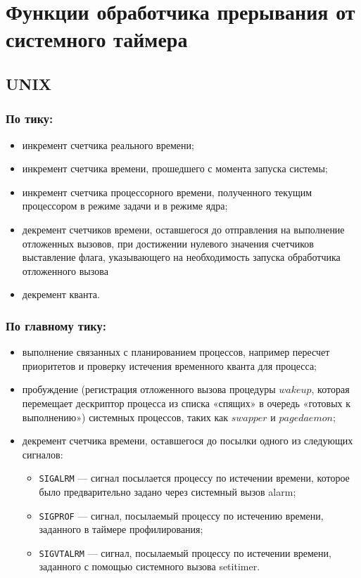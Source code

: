 \chapter{Функции обработчика прерывания от системного таймера}

\section{UNIX}

\subsection*{По тику:}

\begin{itemize}[label=---]
\item инкремент счетчика реального времени;
\item инкремент счетчика времени, прошедшего с момента запуска системы;
\item инкремент счетчика процессорного времени, полученного текущим
процессором в режиме задачи и в режиме ядра;
\item декремент счетчиков времени, оставшегося до отправления на выполнение отложенных вызовов, при достижении нулевого значения счетчиков выставление флага, указывающего на необходимость запуска обработчика отложенного вызова
\item декремент кванта.
\end{itemize}

\subsection*{По главному тику:}

\begin{itemize}[label=---]
\item выполнение связанных с планированием процессов, например пересчет приоритетов и проверку истечения временного кванта для процесса;
\item пробуждение (регистрация отложенного вызова процедуры $wakeup$, которая перемещает дескриптор процесса из списка «спящих» в очередь «готовых к выполнению») системных процессов, таких как $swapper$ и $pagedaemon$;
\item декремент счетчика времени, оставшегося до посылки одного из следующих сигналов: 
\begin{itemize}[label=---]
    \item \texttt{SIGALRM} --- сигнал посылается процессу по истечении времени, которое было предварительно задано через системный вызов alarm;
    \item \texttt{SIGPROF} --- сигнал, посылаемый процессу по истечению времени, заданного в таймере профилирования;
    \item \texttt{SIGVTALRM} --- сигнал, посылаемый процессу по истечении времени, заданного с помощью системного вызова setitimer.
\end{itemize}
\end{itemize}

